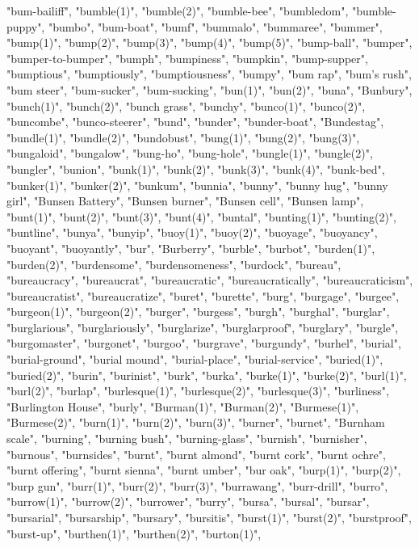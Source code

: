 "bum-bailiff",
"bumble(1)",
"bumble(2)",
"bumble-bee",
"bumbledom",
"bumble-puppy",
"bumbo",
"bum-boat",
"bumf",
"bummalo",
"bummaree",
"bummer",
"bump(1)",
"bump(2)",
"bump(3)",
"bump(4)",
"bump(5)",
"bump-ball",
"bumper",
"bumper-to-bumper",
"bumph",
"bumpiness",
"bumpkin",
"bump-supper",
"bumptious",
"bumptiously",
"bumptiousness",
"bumpy",
"bum rap",
"bum's rush",
"bum steer",
"bum-sucker",
"bum-sucking",
"bun(1)",
"bun(2)",
"buna",
"Bunbury",
"bunch(1)",
"bunch(2)",
"bunch grass",
"bunchy",
"bunco(1)",
"bunco(2)",
"buncombe",
"bunco-steerer",
"bund",
"bunder",
"bunder-boat",
"Bundestag",
"bundle(1)",
"bundle(2)",
"bundobust",
"bung(1)",
"bung(2)",
"bung(3)",
"bungaloid",
"bungalow",
"bung-ho",
"bung-hole",
"bungle(1)",
"bungle(2)",
"bungler",
"bunion",
"bunk(1)",
"bunk(2)",
"bunk(3)",
"bunk(4)",
"bunk-bed",
"bunker(1)",
"bunker(2)",
"bunkum",
"bunnia",
"bunny",
"bunny hug",
"bunny girl",
"Bunsen Battery",
"Bunsen burner",
"Bunsen cell",
"Bunsen lamp",
"bunt(1)",
"bunt(2)",
"bunt(3)",
"bunt(4)",
"buntal",
"bunting(1)",
"bunting(2)",
"buntline",
"bunya",
"bunyip",
"buoy(1)",
"buoy(2)",
"buoyage",
"buoyancy",
"buoyant",
"buoyantly",
"bur",
"Burberry",
"burble",
"burbot",
"burden(1)",
"burden(2)",
"burdensome",
"burdensomeness",
"burdock",
"bureau",
"bureaucracy",
"bureaucrat",
"bureaucratic",
"bureaucratically",
"bureaucraticism",
"bureaucratist",
"bureaucratize",
"buret",
"burette",
"burg",
"burgage",
"burgee",
"burgeon(1)",
"burgeon(2)",
"burger",
"burgess",
"burgh",
"burghal",
"burglar",
"burglarious",
"burglariously",
"burglarize",
"burglarproof",
"burglary",
"burgle",
"burgomaster",
"burgonet",
"burgoo",
"burgrave",
"burgundy",
"burhel",
"burial",
"burial-ground",
"burial mound",
"burial-place",
"burial-service",
"buried(1)",
"buried(2)",
"burin",
"burinist",
"burk",
"burka",
"burke(1)",
"burke(2)",
"burl(1)",
"burl(2)",
"burlap",
"burlesque(1)",
"burlesque(2)",
"burlesque(3)",
"burliness",
"Burlington House",
"burly",
"Burman(1)",
"Burman(2)",
"Burmese(1)",
"Burmese(2)",
"burn(1)",
"burn(2)",
"burn(3)",
"burner",
"burnet",
"Burnham scale",
"burning",
"burning bush",
"burning-glass",
"burnish",
"burnisher",
"burnous",
"burnsides",
"burnt",
"burnt almond",
"burnt cork",
"burnt ochre",
"burnt offering",
"burnt sienna",
"burnt umber",
"bur oak",
"burp(1)",
"burp(2)",
"burp gun",
"burr(1)",
"burr(2)",
"burr(3)",
"burrawang",
"burr-drill",
"burro",
"burrow(1)",
"burrow(2)",
"burrower",
"burry",
"bursa",
"bursal",
"bursar",
"bursarial",
"bursarship",
"bursary",
"bursitis",
"burst(1)",
"burst(2)",
"burstproof",
"burst-up",
"burthen(1)",
"burthen(2)",
"burton(1)",
